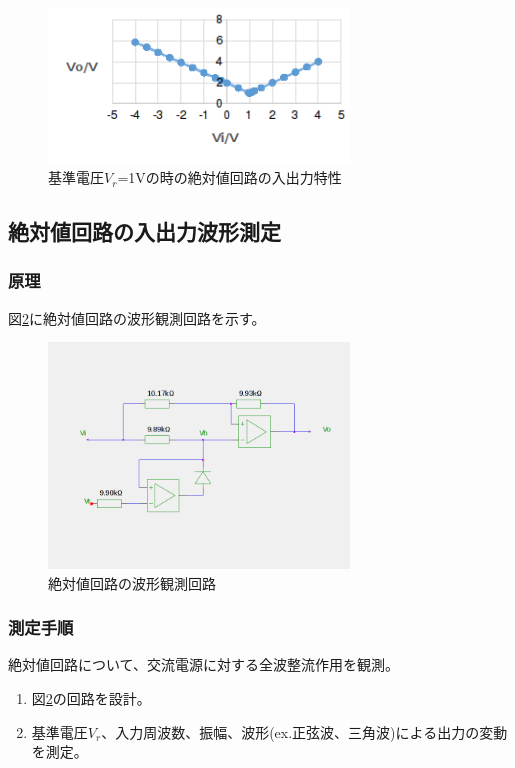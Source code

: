 \documentclass[11pt,a4j]{jsarticle}
\begin{document}
    \begin{figure}[htbp]
  \centering
  \includegraphics[width=8cm,clip]{2_Vr1.png}
  \caption{基準電圧$V_r$=1Vの時の絶対値回路の入出力特性}
  \label{fig:2_Vr1}
 \end{figure}%
    
    
    
  \subsection{絶対値回路の入出力波形測定}
   \subsubsection{原理}
    
    図\ref{fig:abs_wave}に絶対値回路の波形観測回路を示す。
    
    \begin{figure}[htbp]
  \centering
  \includegraphics[width=8cm,clip]{abs_wave.png}
  \caption{絶対値回路の波形観測回路}
  \label{fig:abs_wave}
 \end{figure}%
    
   \subsubsection{測定手順}
    絶対値回路について、交流電源に対する全波整流作用を観測。
    \begin{enumerate}
    \item 図\ref{fig:abs_wave}の回路を設計。
    \item 基準電圧$V_r$、入力周波数、振幅、波形(ex.正弦波、三角波)による出力の変動を測定。
    \end{enumerate}
    
\end{document}
